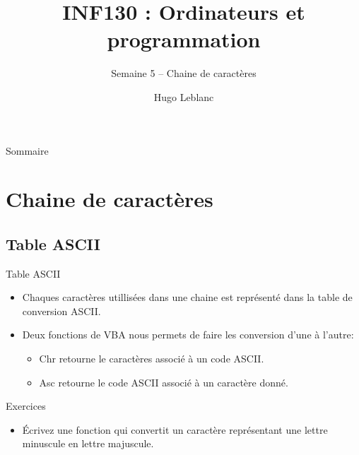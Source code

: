 \documentclass[aspectratio=169,usenames,dvipsnames]{beamer}
\title{INF130 : Ordinateurs et programmation}
\subtitle{Semaine 5 – Chaine de caractères}
\author{Hugo Leblanc}
\begin{document}
    \maketitle

    \begin{frame}{Sommaire}
        \tableofcontents
    \end{frame}

    \section{Chaine de caractères}
    \subsection{Table ASCII}
    \begin{frame}{Table ASCII}
        \begin{itemize}
            \item Chaques caractères utillisées dans une chaine est représenté dans la table de conversion ASCII.
            \item Deux fonctions de VBA nous permets de faire les conversion d’une à l’autre:
            \begin{itemize}
                \item Chr retourne le caractères associé à un code ASCII.
                \item Asc retourne le code ASCII associé à un caractère donné.
            \end{itemize} 
        \end{itemize}
    \end{frame}
    \begin{frame}{Exercices}
        \begin{itemize}
            \item Écrivez une fonction qui convertit un caractère représentant une lettre minuscule en lettre majuscule.
        \end{itemize}
    \end{frame}
\end{document}

